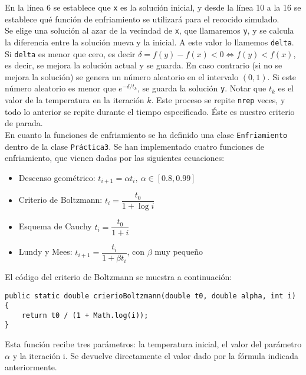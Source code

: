 \documentclass[12pt,a4paper,twoside,openright,titlepage,final]{article}
\begin{document}
En la línea 6 se establece que \texttt{x} es la solución inicial, y desde la línea 10 a la 16 se establece qué función de enfriamiento se utilizará para el recocido simulado.\\

Se elige una solución al azar de la vecindad de \texttt{x}, que llamaremos \texttt{y}, y se calcula la diferencia entre la solución nueva y la inicial. A este valor lo llamemos \texttt{delta}. Si \texttt{delta} es menor que cero, es decir $\delta = f(y) - f(x) < 0 \iff f(y) < f(x)$, es decir, se mejora la solución actual y se guarda. En caso contrario (si no se mejora la solución) se genera un número aleatorio en el intervalo $(0,1)$. Si este número aleatorio es menor que $e^{-\delta/t_k}$, se guarda la solución \texttt{y}. Notar que $t_k$ es el valor de la temperatura en la iteración $k$. Este proceso se repite \texttt{nrep} veces, y todo lo anterior se repite durante el tiempo especificado. Éste es nuestro criterio de parada.\\

En cuanto la funciones de enfriamiento se ha definido una clase \texttt{Enfriamiento} dentro de la clase \texttt{Práctica3}. Se han implementado cuatro funciones de enfriamiento, que vienen dadas por las siguientes ecuaciones:

\begin{itemize}
\item Descenso geométrico: $t_{i+1} = \alpha t_i, \ \alpha \in [0.8, 0.99]$
\item Criterio de Boltzmann: $t_i = \dfrac{t_0}{1 + \log i}$
\item Esquema de Cauchy $t_i = \dfrac{t_0}{1+i}$
\item Lundy y Mees:  $t_{i+1} = \dfrac{t_i}{1 + \beta t_i}$, con $\beta$ muy pequeño
\end{itemize}

El código del criterio de Boltzmann se muestra a continuación:

\begin{verbatim}
public static double crierioBoltzmann(double t0, double alpha, int i) {
    return t0 / (1 + Math.log(i));
}
\end{verbatim}

Esta función recibe tres parámetros: la temperatura inicial, el valor del parámetro $\alpha$ y la iteración i. Se devuelve directamente el valor dado por la fórmula indicada anteriormente.\\ 
\end{document}
